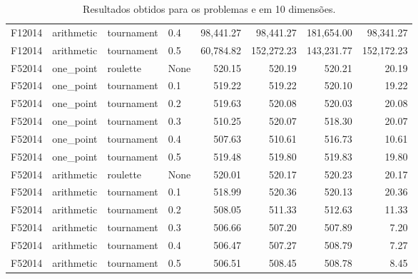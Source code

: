 \begin{table}[!ht]
{\begin{tabular}{llllrrrr}
            F12014                                     & arithmetic & tournament & 0.4  & 98,441.27    & 98,441.27     & 181,654.00    & 98,341.27     \\
            F12014                                     & arithmetic & tournament & 0.5  & 60,784.82    & 152,272.23    & 143,231.77    & 152,172.23    \\
            F52014                                     & one\_point & roulette   & None & 520.15       & 520.19        & 520.21        & 20.19         \\
            F52014                                     & one\_point & tournament & 0.1  & 519.22       & 519.22        & 520.10        & 19.22         \\
            F52014                                     & one\_point & tournament & 0.2  & 519.63       & 520.08        & 520.03        & 20.08         \\
            F52014                                     & one\_point & tournament & 0.3  & 510.25       & 520.07        & 518.30        & 20.07         \\
            F52014                                     & one\_point & tournament & 0.4  & 507.63       & 510.61        & 516.73        & 10.61         \\
            F52014                                     & one\_point & tournament & 0.5  & 519.48       & 519.80        & 519.83        & 19.80         \\
            F52014                                     & arithmetic & roulette   & None & 520.01       & 520.17        & 520.23        & 20.17         \\
            F52014                                     & arithmetic & tournament & 0.1  & 518.99       & 520.36        & 520.13        & 20.36         \\
            F52014                                     & arithmetic & tournament & 0.2  & 508.05       & 511.33        & 512.63        & 11.33         \\
            F52014                                     & arithmetic & tournament & 0.3  & 506.66       & 507.20        & 507.89        & 7.20          \\
            F52014                                     & arithmetic & tournament & 0.4  & 506.47       & 507.27        & 508.79        & 7.27          \\
            F52014                                     & arithmetic & tournament & 0.5  & 506.51       & 508.45        & 508.78        & 8.45          \\
            \toprule
        \end{tabular}%
    }
    \caption{Resultados obtidos para os problemas  e  em 10 dimensões.
    }%
    \label{tab:fitness_10}
\end{table}

